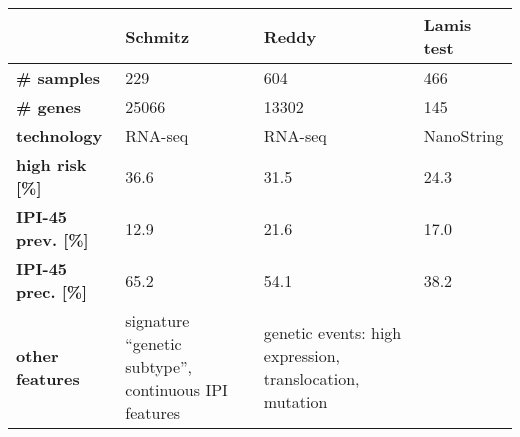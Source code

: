 \begin{table}[ht]
\small
\centering
\begin{tabular}{L{.18\textwidth}R{.2\textwidth}R{.28\textwidth}R{.18\textwidth}}
  \hline
  & \textbf{Schmitz \cite{schmitz18}} & \textbf{Reddy \cite{reddy17}} & \textbf{Lamis test \cite{staiger20}} \\
  \hline
  \textbf{\# samples} & \num{229} & \num{604} & \num{466} \\
  \textbf{\# genes} & \num{25066} & \num{13302} & \num{145} \\
  \textbf{technology} & RNA-seq & RNA-seq & NanoString \\
  \textbf{high risk [\%]} & \num{36.6} & \num{31.5}\footnotemark & \num{24.3} \\
  \textbf{IPI-45 prev. [\%]} & \num{12.9} & \num{21.6} & \num{17.0} \\
  \textbf{IPI-45 prec. [\%]} & \num{65.2} & \num{54.1} & \num{38.2} \\
  \textbf{other features\footnotemark} & signature ``genetic subtype'', 
  continuous IPI features & 
    genetic events: high expression, translocation, mutation &  \\
  \hline
\end{tabular}
\end{table}
